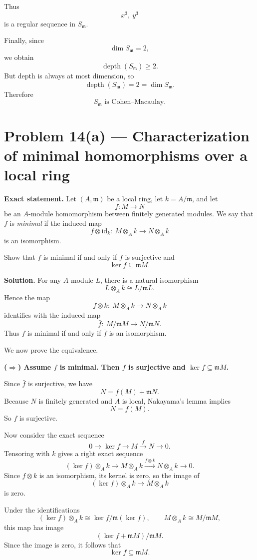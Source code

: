 \documentclass[12pt,a4paper,oneside]{report}
\theoremstyle{notespace}
\begin{document}
Thus
\[
x^3,\ y^3
\]
is a regular sequence in \(S_{\mathfrak m}\).

Finally, since
\[
\dim S_{\mathfrak m}=2,
\]
we obtain
\[
\operatorname{depth}(S_{\mathfrak m})\ge 2.
\]
But depth is always at most dimension, so
\[
\operatorname{depth}(S_{\mathfrak m})=2=\dim S_{\mathfrak m}.
\]
Therefore
\[
\boxed{S_{\mathfrak m}\text{ is Cohen--Macaulay}.}
\]

\section{Problem 14(a) --- Characterization of minimal homomorphisms over a local ring}

\textbf{Exact statement.}
Let \((A,\mathfrak m)\) be a local ring, let \(k=A/\mathfrak m\), and let
\[
f:M\to N
\]
be an \(A\)-module homomorphism between finitely generated modules. We say that \(f\) is \emph{minimal} if the induced map
\[
f\otimes \mathrm{id}_k:\ M\otimes_A k \to N\otimes_A k
\]
is an isomorphism.

Show that \(f\) is minimal if and only if \(f\) is surjective and
\[
\ker f\subseteq \mathfrak m M.
\]

\textbf{Solution.}
For any \(A\)-module \(L\), there is a natural isomorphism
\[
L\otimes_A k \cong L/\mathfrak m L.
\]
Hence the map
\[
f\otimes k:\ M\otimes_A k \to N\otimes_A k
\]
identifies with the induced map
\[
\bar f:\ M/\mathfrak m M \to N/\mathfrak m N.
\]
Thus \(f\) is minimal if and only if \(\bar f\) is an isomorphism.

We now prove the equivalence.

\medskip

\textbf{(\(\Rightarrow\)) Assume \(f\) is minimal. Then \(f\) is surjective and \(\ker f\subseteq \mathfrak m M\).}

Since \(\bar f\) is surjective, we have
\[
N=f(M)+\mathfrak m N.
\]
Because \(N\) is finitely generated and \(A\) is local, Nakayama's lemma implies
\[
N=f(M).
\]
So \(f\) is surjective.

Now consider the exact sequence
\[
0\to \ker f \to M \xrightarrow{f} N \to 0.
\]
Tensoring with \(k\) gives a right exact sequence
\[
(\ker f)\otimes_A k \to M\otimes_A k \xrightarrow{f\otimes k} N\otimes_A k \to 0.
\]
Since \(f\otimes k\) is an isomorphism, its kernel is zero, so the image of
\[
(\ker f)\otimes_A k \to M\otimes_A k
\]
is zero.

Under the identifications
\[
(\ker f)\otimes_A k \cong \ker f/\mathfrak m(\ker f),
\qquad
M\otimes_A k \cong M/\mathfrak m M,
\]
this map has image
\[
(\ker f+\mathfrak m M)/\mathfrak m M.
\]
Since the image is zero, it follows that
\[
\ker f\subseteq \mathfrak m M.
\]
\end{document}
